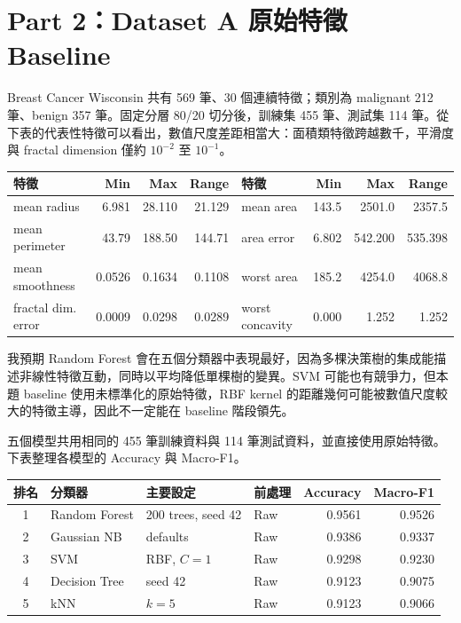 \section*{Part 2：Dataset A 原始特徵 Baseline}
\vspace{-0.5em}

Breast Cancer Wisconsin 共有 569 筆、30 個連續特徵；類別為 malignant 212 筆、benign 357 筆。固定分層 80/20 切分後，訓練集 455 筆、測試集 114 筆。從下表的代表性特徵可以看出，數值尺度差距相當大：面積類特徵跨越數千，平滑度與 fractal dimension 僅約 $10^{-2}$ 至 $10^{-1}$。

\begin{center}
\compacttable
\begin{tabular*}{0.92\linewidth}{@{\extracolsep{\fill}}lrrrlrrr}
\toprule
特徵 & Min & Max & Range & 特徵 & Min & Max & Range \\
\midrule
mean radius & 6.981 & 28.110 & 21.129 & mean area & 143.5 & 2501.0 & 2357.5 \\
mean perimeter & 43.79 & 188.50 & 144.71 & area error & 6.802 & 542.200 & 535.398 \\
mean smoothness & 0.0526 & 0.1634 & 0.1108 & worst area & 185.2 & 4254.0 & 4068.8 \\
fractal dim. error & 0.0009 & 0.0298 & 0.0289 & worst concavity & 0.000 & 1.252 & 1.252 \\
\bottomrule
\end{tabular*}
\end{center}

我預期 Random Forest 會在五個分類器中表現最好，因為多棵決策樹的集成能描述非線性特徵互動，同時以平均降低單棵樹的變異。SVM 可能也有競爭力，但本題 baseline 使用未標準化的原始特徵，RBF kernel 的距離幾何可能被數值尺度較大的特徵主導，因此不一定能在 baseline 階段領先。


五個模型共用相同的 455 筆訓練資料與 114 筆測試資料，並直接使用原始特徵。下表整理各模型的 Accuracy 與 Macro-F1。

\begin{center}
\compacttable
\begin{tabular*}{0.82\linewidth}{@{\extracolsep{\fill}}clllrr}
\toprule
排名 & 分類器 & 主要設定 & 前處理 & Accuracy & Macro-F1 \\
\midrule
1 & Random Forest & 200 trees, seed 42 & Raw & 0.9561 & 0.9526 \\
2 & Gaussian NB & defaults & Raw & 0.9386 & 0.9337 \\
3 & SVM & RBF, $C=1$ & Raw & 0.9298 & 0.9230 \\
4 & Decision Tree & seed 42 & Raw & 0.9123 & 0.9075 \\
5 & kNN & $k=5$ & Raw & 0.9123 & 0.9066 \\
\bottomrule
\end{tabular*}
\end{center}

